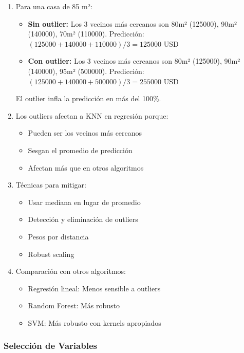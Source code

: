 \documentclass[12pt]{article}
\begin{document}
\begin{enumerate}
    \item Para una casa de 85 m²:
    \begin{itemize}
        \item \textbf{Sin outlier:} Los 3 vecinos más cercanos son 80m² (125000), 90m² (140000), 70m² (110000). Predicción: $(125000 + 140000 + 110000)/3 = 125000$ USD
        \item \textbf{Con outlier:} Los 3 vecinos más cercanos son 80m² (125000), 90m² (140000), 95m² (500000). Predicción: $(125000 + 140000 + 500000)/3 = 255000$ USD
    \end{itemize}
    El outlier infla la predicción en más del 100\%.
    
    \item Los outliers afectan a KNN en regresión porque:
    \begin{itemize}
        \item Pueden ser los vecinos más cercanos
        \item Sesgan el promedio de predicción
        \item Afectan más que en otros algoritmos
    \end{itemize}
    \item Técnicas para mitigar:
    \begin{itemize}
        \item Usar mediana en lugar de promedio
        \item Detección y eliminación de outliers
        \item Pesos por distancia
        \item Robust scaling
    \end{itemize}
    \item Comparación con otros algoritmos:
    \begin{itemize}
        \item Regresión lineal: Menos sensible a outliers
        \item Random Forest: Más robusto
        \item SVM: Más robusto con kernels apropiados
    \end{itemize}
\end{enumerate}

\subsubsection{Selección de Variables}
\end{document}
